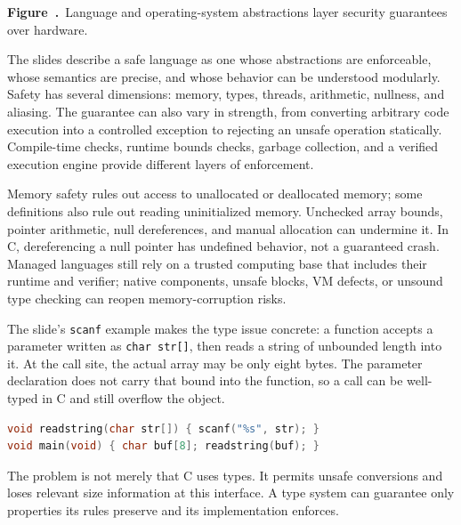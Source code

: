 \documentclass[11pt,a4paper]{article}
\numberwithin{figure}{section}
\newcommand{\diagramcaption}[1]{\par\smallskip\refstepcounter{figure}\begin{center}\small\textbf{Figure~\thefigure.}~#1\end{center}}
\begin{document}
\begin{center}\end{center}
\diagramcaption{Language and operating-system abstractions layer security guarantees over hardware.}

The slides describe a safe language as one whose abstractions are enforceable, whose semantics are precise, and whose behavior can be understood modularly. Safety has several dimensions: memory, types, threads, arithmetic, nullness, and aliasing. The guarantee can also vary in strength, from converting arbitrary code execution into a controlled exception to rejecting an unsafe operation statically. Compile-time checks, runtime bounds checks, garbage collection, and a verified execution engine provide different layers of enforcement.

Memory safety rules out access to unallocated or deallocated memory; some definitions also rule out reading uninitialized memory. Unchecked array bounds, pointer arithmetic, null dereferences, and manual allocation can undermine it. In C, dereferencing a null pointer has undefined behavior, not a guaranteed crash. Managed languages still rely on a trusted computing base that includes their runtime and verifier; native components, unsafe blocks, VM defects, or unsound type checking can reopen memory-corruption risks.

The slide's \texttt{scanf} example makes the type issue concrete: a function accepts a parameter written as \texttt{char str[]}, then reads a string of unbounded length into it. At the call site, the actual array may be only eight bytes. The parameter declaration does not carry that bound into the function, so a call can be well-typed in C and still overflow the object.
\begin{lstlisting}[language=C]
void readstring(char str[]) { scanf("%s", str); }
void main(void) { char buf[8]; readstring(buf); }
\end{lstlisting}
The problem is not merely that C uses types. It permits unsafe conversions and loses relevant size information at this interface. A type system can guarantee only properties its rules preserve and its implementation enforces.
\end{document}
